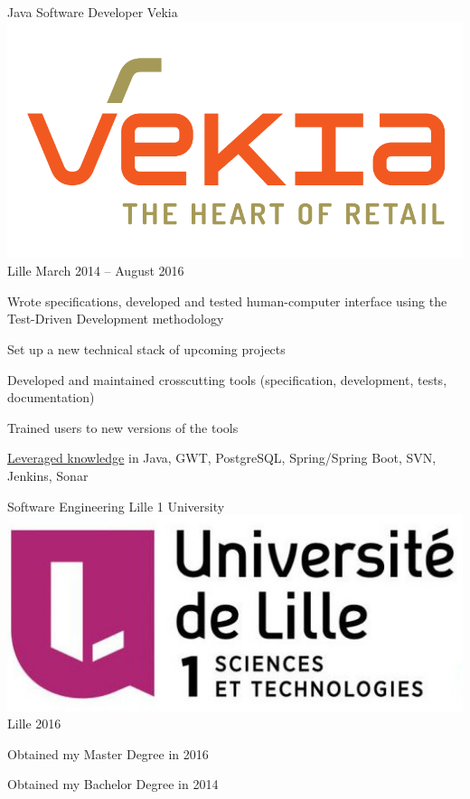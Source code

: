 \documentclass[12pt, a4paper]{awesome-cv}
\begin{document}
\begin{cventries}
            \cventry
                {Java Software Developer}
                {Vekia ~~ \includegraphics[scale=0.05]{images/logo_vekia}}
                {Lille}
                {March 2014 -- August 2016}
                {
                    \begin{cvitems}
                        \item {Wrote specifications, developed and tested human-computer interface using the Test-Driven Development methodology}
                        \item {Set up a new technical stack of upcoming projects}
                        \item {Developed and maintained crosscutting tools (specification, development, tests, documentation)}
                        \item {Trained users to new versions of the tools}
                        \item {\underline{Leveraged knowledge} in Java, GWT, PostgreSQL, Spring/Spring Boot, SVN, Jenkins, Sonar}
                    \end{cvitems}
                }
        \end{cventries}


        \bigskip

        \cventry
            {Software Engineering}
            {Lille 1 University ~~ \includegraphics[scale=0.05]{images/logo_univ}}
            {Lille}
            {2016}
            {
                \begin{cvitems}
                    \item {Obtained my Master Degree in 2016}
                    \item {Obtained my Bachelor Degree in 2014}
                \end{cvitems}
            }
\end{document}
